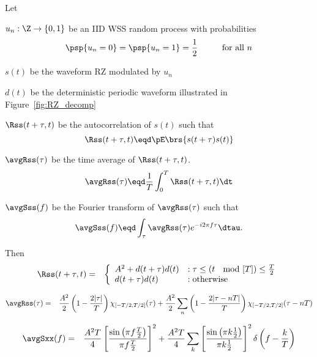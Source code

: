 \begin{theorem}
\label{thm:RZ_stat}
Let
\begin{liste}
   \item $u_n:\Z\to\{0,1\}$ be an IID WSS random process with probabilities 
         \[ \psp\{u_n=0\}=\psp\{u_n=1\}= \frac{1}{2} \hspace{1cm}\mbox{for all $n$}\]
   \item $s(t)$ be the waveform RZ modulated by $u_n$
   \item $d(t)$ be the deterministic periodic waveform illustrated in 
         Figure~\ref{fig:RZ_decomp}
   \item $\Rss(t+\tau,t)$ be the autocorrelation of $s(t)$ such that
         \[ \Rss(t+\tau,t) \eqd \pE\brs{s(t+\tau)s(t)}\]
   \item $\avgRss(\tau)$ be the time average of $\Rss(t+\tau,t)$.
         \[ \avgRss(\tau) \eqd \frac{1}{T}\int_0^T \Rss(t+\tau,t) \dt \]
   \item $\avgSss(f)$ be the Fourier transform of $\avgRss(\tau)$ such that
         \[ \avgSss(f) \eqd \int_\tau \avgRss(\tau) e^{-i2\pi f\tau} \dtau.\]
\end{liste}

Then 
\begin{eqnarray*}
   \Rss(t+\tau,t) 
     &=& 
         \left\{
         \begin{array}{ll}
            A^2 + d(t+\tau)d(t) & :\tau \le (t\;\mod[T])\le \frac{T}{2} \\
            d(t+\tau)d(t)       & :\mbox{otherwise}
         \end{array}
         \right.
\end{eqnarray*}

\begin{eqnarray*}
   \avgRss(\tau) 
     &=& \frac{A^2}{2}\left( 1- \frac{2|\tau|}{T}\right) \chi_{[-T/2,T/2]}(\tau) + 
         \frac{A^2}{2} \sum_n \left( 1 - \frac{2|\tau-nT|}{T} \right)\chi_{[-T/2,T/2]}(\tau-nT)
\end{eqnarray*}

\begin{eqnarray*}
   \avgSxx(f) 
     &=& \frac{A^2 T}{4} \left[ \frac{\sin\left(\pi f\frac{T}{2}\right)}{\pi f\frac{T}{2}}\right]^2 + 
         \frac{A^2 T}{4} \sum_k \left[ \frac{\sin\left(\pi k\frac{1}{2}\right)}{\pi k\frac{1}{2}}\right]^2 \delta\left(f-\frac{k}{T}\right) 
\end{eqnarray*}
\end{theorem}


